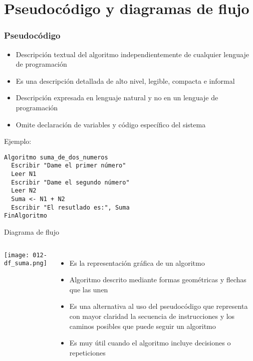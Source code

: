 \section{Pseudocódigo y diagramas de flujo}

\begin{frame}[fragile]
  \frametitle{Pseudocódigo}
  \begin{itemize}
    \item Descripción textual del algoritmo independientemente de cualquier
      lenguaje de programación
    \pausa
    \item Es una descripción detallada de alto nivel, legible, compacta e
      informal
    \pausa
    \item Descripción expresada en lenguaje natural y no en un lenguaje de
      programación
    \pausa
    \item Omite declaración de variables y código específico del sistema
  \end{itemize}
  \pausa
  Ejemplo:
  \begin{lstlisting}[style=pseudocodigo]
Algoritmo suma_de_dos_numeros
  Escribir "Dame el primer número"
  Leer N1
  Escribir "Dame el segundo número"
  Leer N2
  Suma <- N1 + N2
  Escribir "El resutlado es:", Suma
FinAlgoritmo
  \end{lstlisting}
\end{frame}

\begin{frame}[c]{Diagrama de flujo}
  \begin{columns}
      \begin{center}
        \texttt{[image: 012-df\_suma.png]}
      \end{center}
      \begin{itemize}
        \item Es la representación gráfica de un algoritmo
        \pausa
        \item Algoritmo descrito mediante formas geométricas y flechas que las unen
        \pausa
        \item Es una alternativa al uso del pseudocódigo que representa con mayor
          claridad la secuencia de instrucciones y los caminos posibles que puede
          seguir un algoritmo
        \pausa
        \item Es muy útil cuando el algoritmo incluye decisiones o repeticiones
      \end{itemize}
  \end{columns}
\end{frame}

